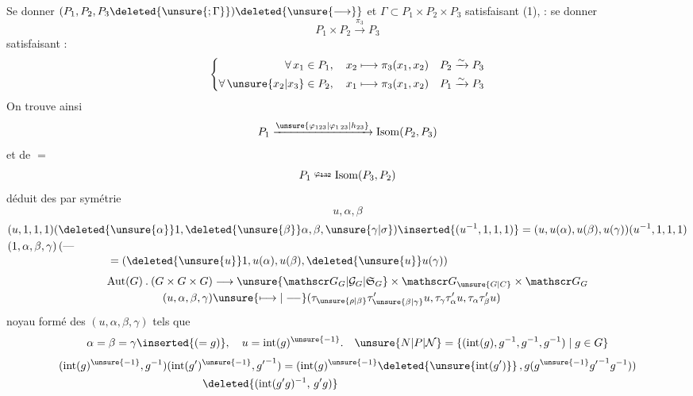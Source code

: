 Se donner \((P_1,P_2,P_3\deleted{\unsure{;\Gamma}})\deleted{\unsure{\longrightarrow}}\) et \(\Gamma\subset P_1\times P_2\times P_3\) satisfaisant (1),  : se donner
\[
 P_1\times P_2\xrightarrow{\pi_3}P_3
\]
satisfaisant :
\[
 \left\{\begin{aligned}
 \forall\,x_1\in P_1,\quad x_2&\longmapsto \pi_3(x_1,x_2)& P_2&\xrightarrow{\sim}P_3\\
 \forall\,\unsure{x_2|x_3}\in P_2,\quad x_1&\longmapsto \pi_3(x_1,x_2)& P_1&\xrightarrow{\sim}P_3
 \end{aligned}\right.
\]
On trouve ainsi
\[
 P_1\xrightarrow{\unsure{\varphi_{123}|\varphi_{1\,23}|h_{23}}}\operatorname{Isom}(P_2,P_3)
\]
et de \(=\)
\[
 P_1\overset{\varphi_{132}}{\relbar\joinrel\relbar}\operatorname{Isom}(P_3,P_2)
\]
déduit des  par symétrie
\[
 u,\alpha,\beta
\]
\[
\begin{aligned}
 &(u,1,1,1)(\deleted{\unsure{\alpha}}1,\deleted{\unsure{\beta}}\alpha,\beta,\unsure{\gamma|\sigma})\inserted{(u^{-1},1,1,1)}
 =(u,u(\alpha),u(\beta),u(\gamma))(u^{-1},1,1,1)\\
 &(1,\alpha,\beta,\gamma)\,(\text{---}\\[-2pt]
 &\hspace{9em}=(\deleted{\unsure{u}}1,u(\alpha),u(\beta),\deleted{\unsure{u}}u(\gamma))
\end{aligned}
\]
\[
\begin{aligned}
 \operatorname{Aut}(G)\mathbin{.}(G\times G\times G)&\longrightarrow
 \unsure{\mathscr G_G|\mathcal G_G|\mathfrak S_G}\times\mathscr G_{\unsure{G|C}}\times\mathscr G_G\\
 (u,\alpha,\beta,\gamma)&\unsure{\longmapsto|\relbar\joinrel\relbar}(\tau_{\unsure{\rho|\beta}}\tau'_{\unsure{\beta|\gamma}}u,\tau_\gamma\tau'_\alpha u,\tau_\alpha\tau'_\beta u)
\end{aligned}
\]
noyau formé des \((u,\alpha,\beta,\gamma)\) tels que
\[
 \alpha=\beta=\gamma\inserted{(=g)},\quad u=\operatorname{int}(g)^{\unsure{-1}}.
 \quad \unsure{N|P|\mathcal N}=\{(\operatorname{int}(g),g^{-1},g^{-1},g^{-1})\mid g\in G\}
\]
\[
\begin{aligned}
 &(\operatorname{int}(g)^{\unsure{-1}},g^{-1})(\operatorname{int}(g')^{\unsure{-1}},{g'}^{-1})
 =(\operatorname{int}(g)^{\unsure{-1}}\deleted{\unsure{\operatorname{int}(g')}}\,,
 g(g^{\unsure{-1}}{g'}^{-1}g^{-1}))\\
 &\hspace{13em}\deleted{(\operatorname{int}(g'g)^{-1},\,g'g)}
\end{aligned}
\]
